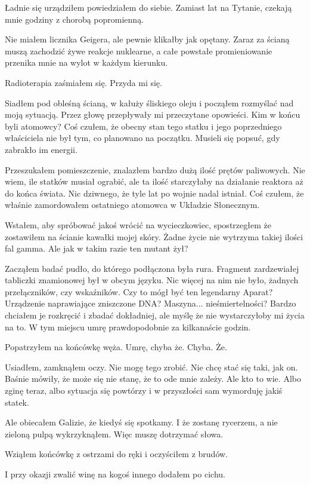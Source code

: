 \begin{dialogue}
	\ds{} Ładnie się urządziłem \dm{} powiedziałem do siebie. \dm{} Zamiast lat na Tytanie, czekają mnie godziny z chorobą popromienną.
\end{dialogue}
Nie miałem licznika Geigera, ale pewnie klikałby jak opętany.
Zaraz za ścianą muszą zachodzić żywe reakcje nuklearne, a całe powstałe promieniowanie przenika mnie na wylot w każdym kierunku.
\begin{dialogue}
	\ds{} Radioterapia \dm{} zaśmiałem się. \dm{} Przyda mi się.
\end{dialogue}

Siadłem pod obleśną ścianą, w kałuży śliskiego oleju i począłem rozmyślać nad moją sytuacją.
Przez głowę przepływały mi przeczytane opowieści.
Kim w końcu byli atomowcy? Coś czułem, że obecny stan tego statku i jego poprzedniego właściciela nie był tym, co planowano na początku.
Musieli się popsuć, gdy zabrakło im energii.

Przeszukałem pomieszczenie, znalazłem bardzo dużą ilość prętów paliwowych.
Nie wiem, ile statków musiał ograbić, ale ta ilość starczyłaby na działanie reaktora aż do końca świata.
Nic dziwnego, że tyle lat po wojnie nadal istniał.
Coś czułem, że właśnie zamordowałem ostatniego atomowca w Układzie Słonecznym.

Wstałem, aby spróbować jakoś wrócić na wycieczkowiec, spostrzegłem że zostawiłem na ścianie kawałki mojej skóry.
Żadne życie nie wytrzyma takiej ilości fal gamma.
Ale jak w takim razie ten mutant żył?

Zacząłem badać pudło, do którego podłączona była rura.
Fragment zardzewiałej tabliczki znamionowej był w obcym języku.
Nic więcej na nim nie było, żadnych przełączników, czy wskaźników.
Czy to mógł być ten legendarny Aparat?
Urządzenie naprawiające zniszczone DNA? Maszyna... nieśmiertelności?
Bardzo chciałem je rozkręcić i zbadać dokładniej, ale myślę że nie wystarczyłoby mi życia na to.
W tym miejscu umrę prawdopodobnie za kilkanaście godzin.

Popatrzyłem na końcówkę węża.
Umrę, chyba że.
Chyba. Że.

Usiadłem, zamknąłem oczy.
Nie mogę tego zrobić.
Nie chcę stać się taki, jak on.
Baśnie mówiły, że może się nie stanę, że to ode mnie zależy.
Ale kto to wie.
Albo zginę teraz, albo sytuacja się powtórzy i w przyszłości sam wymorduję jakiś statek.

\begin{dialogue}
	\ds{} Ale obiecałem Galizie, że kiedyś się spotkamy. I że zostanę rycerzem, a nie zieloną pulpą \dm{} wykrzyknąłem. \dm{} Więc muszę dotrzymać słowa.
\end{dialogue}
Wziąłem końcówkę z ostrzami do ręki i oczyściłem z brudów.
\begin{dialogue}
	\ds{} I przy okazji zwalić winę na kogoś innego \dm{} dodałem po cichu.
\end{dialogue}

